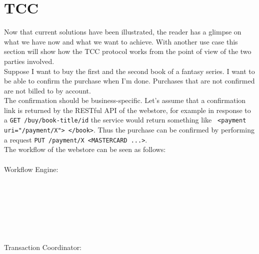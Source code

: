 \section{TCC}
\label{tcc-general-protocol}
Now that current solutions have been illustrated, the reader has a glimpse on what we have now and what we want to achieve. With another use case this section will show how the TCC protocol works from the point of view of the two parties involved.\\
Suppose I want to buy the first and the second book of a fantasy series. I want to be able to confirm the purchase when I'm done. Purchases that are not confirmed are not billed to by account.\\
The confirmation should be business-specific. Let's assume that a confirmation link is returned by the RESTful API of the webstore, for example in response to a {\tt GET /buy/{book-title}/{id}} the service would return something like {\tt <book title id> <payment uri="/payment/X"> </book>}. Thus the purchase can be confirmed by performing a request {\tt PUT /payment/X <MASTERCARD ...>}.\\
The workflow of the webstore can be seen as follows:\\
\\
Workflow Engine: \\
\\
\\
\\
\\
\\
\\
\\
Transaction Coordinator:\\
\\
\\

